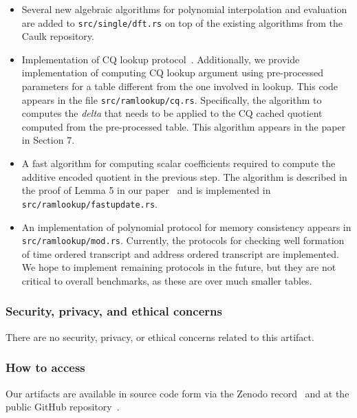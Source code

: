 \documentclass[sigconf]{acmart}
\begin{document}
	\begin{itemize}[leftmargin=2em, label=-]
		\item Several new algebraic algorithms for polynomial interpolation and evaluation are added to {\tt src/single/dft.rs} on top of the existing algorithms from the Caulk repository.
		\item Implementation of CQ lookup protocol~\cite{EPRINT:EagFioGab22}. Additionally, we provide implementation of computing CQ lookup argument using pre-processed parameters for
		a table different from the one involved in lookup. This code appears in the file {\tt src/ramlookup/cq.rs}. Specifically, the algorithm to computes the {\em delta}
		that needs to be applied to the CQ cached quotient computed from the pre-processed table. This algorithm appears in the
		paper~\cite{full-ver} in Section 7.
		\item A fast algorithm for computing scalar coefficients required to compute the additive encoded quotient in the previous step. The algorithm
		is described in the proof of Lemma 5 in our paper~\cite{full-ver} and is implemented in {\tt src/ramlookup/fastupdate.rs}.
		\item An implementation of polynomial protocol for memory consistency appears in {\tt src/ramlookup/mod.rs}.
		Currently, the protocols for checking well formation of time ordered transcript and address ordered transcript are implemented.
		We hope to implement remaining protocols in the future, but they are not critical to overall benchmarks, as these are over much smaller tables.
	\end{itemize}
	

	
	

	
	
	\subsubsection{Security, privacy, and ethical concerns}
	
	There are no security, privacy, or ethical concerns related to this artifact. 
	
	
	\subsubsection{How to access}
	Our artifacts are available in source code form via the Zenodo record~\cite{artifact-archive}
	and at the public GitHub repository~\cite{github-archive}.
	
\end{document}
